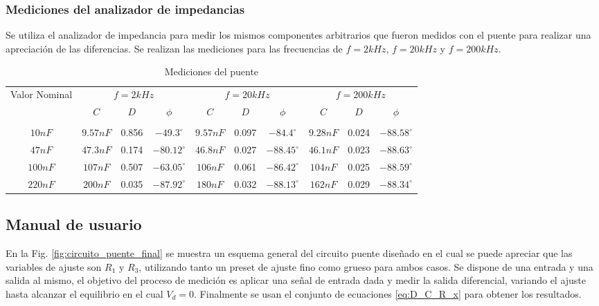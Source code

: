 \subsubsection{Mediciones del analizador de impedancias}
Se utiliza el analizador de impedancia para medir los mismos componentes arbitrarios que fueron medidos con el puente para realizar una apreciaci\'on de las diferencias. Se realizan las mediciones para las frecuencias de $f = 2kHz$, $f = 20kHz$ y $f = 200kHz$.

\begin{table}[H]
    \centering
    \begin{tabular}{c | c c c  c c c  c c c}
         Valor Nominal & \multicolumn{3}{c}{$f = 2kHz$} & \multicolumn{3}{c}{$f = 20kHz$} & \multicolumn{3}{c}{$f = 200kHz$} \\
         & $C$ & $D$ & $\phi$ & $C$ & $D$ & $\phi$ & $C$ & $D$ & $\phi$  \\
         \hline \\
         $10nF$ & $9.57nF$ &0.856 &$-49.3^\circ$& $9.57nF$&0.097&$-84.4^\circ$ &$9.28nF$ &0.024 &$-88.58^\circ$ \\
         $47nF$ & $47.3nF$&0.174 & $-80.12^\circ$& $46.8nF$&0.027 &  $-88.45^\circ$& $46.1nF$& 0.023&$-88.63^\circ$  \\
         $100nF$ & $107nF$& 0.507& $-63.05^\circ$& $106nF$ &0.061 &$-86.42^\circ$ &$104nF$ & 0.025&$-88.59^\circ$  \\
         $220nF$ &$200nF$ &0.035 & $-87.92^\circ$&$180nF$ & 0.032& $-88.13^\circ$&$162nF$ & 0.029& $-88.34^\circ$ \\
         \hline
    \end{tabular}
    \caption{Mediciones del puente}
    \label{tab:mediciones_del_puente}
\end{table}

\subsection{Manual de usuario}

En la Fig. \ref{fig:circuito_puente_final} se muestra un esquema general del circuito puente dise\~nado en el cual se puede apreciar que las variables de ajuste son $R_1$ y $R_3$, utilizando tanto un preset de ajuste fino como grueso para ambos casos. Se dispone de una entrada y una salida al mismo, el objetivo del proceso de medici\'on es aplicar una se\~nal de entrada dada y medir la salida diferencial, variando el ajuste hasta alcanzar el equilibrio en el cual $V_d = 0$. Finalmente se usan el conjunto de ecuaciones \ref{eq:D_C_R_x} para obtener los resultados.

